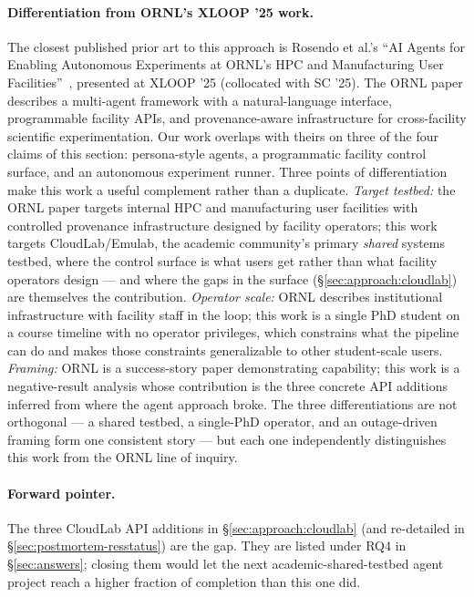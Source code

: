 \documentclass[11pt,a4paper]{article}
\begin{document}
\paragraph{Differentiation from ORNL's XLOOP '25 work.}
The closest published prior art to this approach is Rosendo et al.'s ``AI Agents for Enabling Autonomous Experiments at ORNL's HPC and Manufacturing User Facilities''~\cite{ornl-agents-xloop25}, presented at XLOOP '25 (collocated with SC '25). The ORNL paper describes a multi-agent framework with a natural-language interface, programmable facility APIs, and provenance-aware infrastructure for cross-facility scientific experimentation. Our work overlaps with theirs on three of the four claims of this section: persona-style agents, a programmatic facility control surface, and an autonomous experiment runner. Three points of differentiation make this work a useful complement rather than a duplicate. \emph{Target testbed:} the ORNL paper targets internal HPC and manufacturing user facilities with controlled provenance infrastructure designed by facility operators; this work targets CloudLab/Emulab, the academic community's primary \emph{shared} systems testbed, where the control surface is what users get rather than what facility operators design --- and where the gaps in the surface (\S\ref{sec:approach:cloudlab}) are themselves the contribution. \emph{Operator scale:} ORNL describes institutional infrastructure with facility staff in the loop; this work is a single PhD student on a course timeline with no operator privileges, which constrains what the pipeline can do and makes those constraints generalizable to other student-scale users. \emph{Framing:} ORNL is a success-story paper demonstrating capability; this work is a negative-result analysis whose contribution is the three concrete API additions inferred from where the agent approach broke. The three differentiations are not orthogonal --- a shared testbed, a single-PhD operator, and an outage-driven framing form one consistent story --- but each one independently distinguishes this work from the ORNL line of inquiry.

\paragraph{Forward pointer.} The three CloudLab API additions in §\ref{sec:approach:cloudlab} (and re-detailed in §\ref{sec:postmortem-resstatus}) are the gap. They are listed under RQ4 in §\ref{sec:answers}; closing them would let the next academic-shared-testbed agent project reach a higher fraction of completion than this one did.
\end{document}
